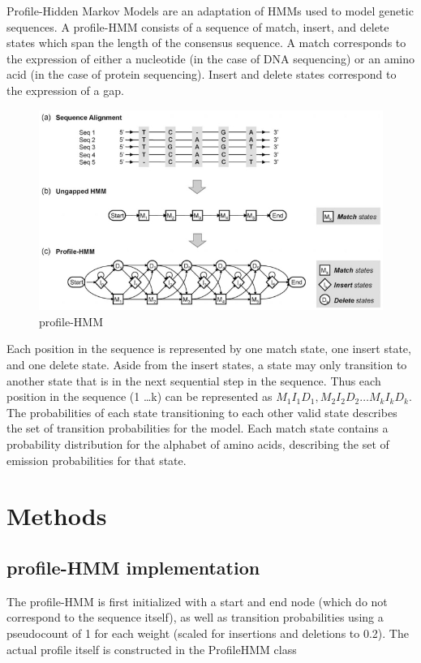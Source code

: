 \documentclass{article}
\begin{document}
Profile-Hidden Markov Models are an adaptation of HMMs used to model genetic sequences. A profile-HMM consists of a sequence of match, insert, and delete states which span the length of the consensus sequence. A match corresponds to the expression of either a nucleotide (in the case of DNA sequencing) or an amino acid (in the case of protein sequencing). Insert and delete states correspond to the expression of a gap. 
\begin{figure}[H]
\centering
\includegraphics[width=.8\textwidth]{materials/profile-HMM.png}
\caption{profile-HMM\footnotemark[1]}
\end{figure}
Each position in the sequence is represented by one match state, one insert state, and one delete state. Aside from the insert states, a state may only transition to another state that is in the next sequential step in the sequence. Thus each position in the sequence (1 \ldots k) can be represented as $M_{1} I_{1} D_{1}, M_{2} I_{2} D_{2} \ldots M_{k} I_{k} D_{k}$. The probabilities of each state transitioning to each other valid state describes the set of transition probabilities for the model. Each match state contains a probability distribution for the alphabet of amino acids, describing the set of emission probabilities for that state.

\section{Methods}


\subsection{profile-HMM implementation}
The profile-HMM is first initialized with a start and end node (which do not correspond to the sequence itself), as well as transition probabilities using a pseudocount of 1 for each weight (scaled for insertions and deletions to 0.2). The actual profile itself is constructed in the ProfileHMM class
\end{document}
